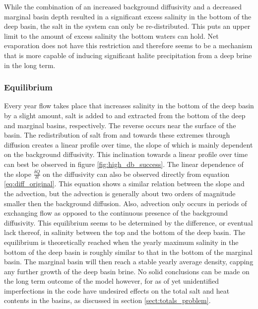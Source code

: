 \documentclass[twocolumn]{article}
\begin{document}
While the combination of an increased background diffusivity and a decreased marginal basin depth resulted in a significant excess salinity in the bottom of the deep basin, the salt in the system can only be re-distributed. This puts an upper limit to the amount of excess salinity the bottom waters can hold. Net evaporation does not have this restriction and therefore seems to be a mechanism that is more capable of inducing significant halite precipitation from a deep brine in the long term.

\subsubsection{Equilibrium}
Every year flow takes place that increases salinity in the bottom of the deep basin by a slight amount, salt is added to and extracted from the bottom of the deep and marginal basins, respectively. The reverse occurs near the surface of the basin. The redistribution of salt from and towards these extremes through diffusion creates a linear profile over time, the slope of which is mainly dependent on the background diffusivity. This inclination towards a linear profile over time can best be observed in figure \ref{fig:high_db_success}. The linear dependence of the slope $\frac{\delta Q}{\delta t}$ on the diffusivity can also be observed directly from equation \ref{eq:diff_original}. This equation shows a similar relation between the slope and the advection, but the advection is generally about two orders of magnitude smaller then the background diffusion. Also, advection only occurs in periods of exchanging flow as opposed to the continuous presence of the background diffusivity. 
This equilibrium seems to be determined by the difference, or eventual lack thereof, in salinity between the top and the bottom of the deep basin. The equilibrium is theoretically reached when the yearly maximum salinity in the bottom of the deep basin is roughly similar to that in the bottom of the marginal basin. The marginal basin will then reach a stable yearly average density, capping any further growth of the deep basin brine. No solid conclusions can be made on the long term outcome of the model however, for as of yet unidentified imperfections in the code have undesired effects on the total salt and heat contents in the basins, as discussed in section \ref{sect:totals_problem}.
\end{document}
